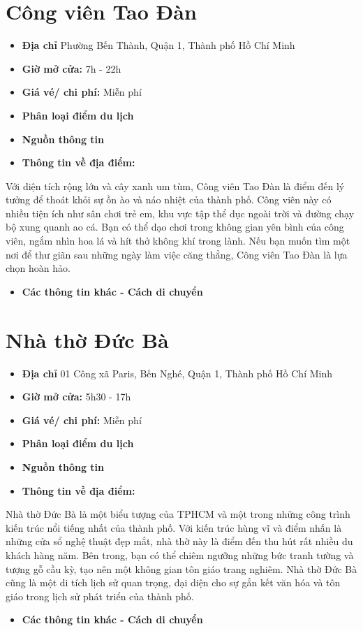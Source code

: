 \documentclass{article}
\begin{document}
\section{Công viên Tao Đàn}
\begin{itemize}
    \item{\textbf{Địa chỉ}} Phường Bến Thành, Quận 1, Thành phố Hồ Chí Minh
    \item{\textbf{Giờ mở cửa:}} 7h - 22h
    \item{\textbf{Giá vé/ chi phí:}} Miễn phí
    \item{\textbf{Phân loại điểm du lịch} }
    \item{\textbf{Nguồn thông tin}}
    \item{\textbf{Thông tin về địa điểm:}}
\end{itemize}
Với diện tích rộng lớn và cây xanh um tùm, Công viên Tao Đàn là điểm đến lý tưởng để thoát khỏi sự ồn ào và náo nhiệt của thành phố. Công viên này có nhiều tiện ích như sân chơi trẻ em, khu vực tập thể dục ngoài trời và đường chạy bộ xung quanh ao cá. Bạn có thể dạo chơi trong không gian yên bình của công viên, ngắm nhìn hoa lá và hít thở không khí trong lành. Nếu bạn muốn tìm một nơi để thư giãn sau những ngày làm việc căng thẳng, Công viên Tao Đàn là lựa chọn hoàn hảo.
\begin{itemize}
    \item{\textbf{Các thông tin khác - Cách di chuyển}}
\end{itemize}

\section{Nhà thờ Đức Bà}
\begin{itemize}
    \item{\textbf{Địa chỉ}} 01 Công xã Paris, Bến Nghé, Quận 1, Thành phố Hồ Chí Minh
    \item{\textbf{Giờ mở cửa:}} 5h30 - 17h
    \item{\textbf{Giá vé/ chi phí:}} Miễn phí
    \item{\textbf{Phân loại điểm du lịch} }
    \item{\textbf{Nguồn thông tin}}
    \item{\textbf{Thông tin về địa điểm:}}
\end{itemize}
Nhà thờ Đức Bà là một biểu tượng của TPHCM và một trong những công trình kiến trúc nổi tiếng nhất của thành phố. Với kiến trúc hùng vĩ và điểm nhấn là những cửa sổ nghệ thuật đẹp mắt, nhà thờ này là điểm đến thu hút rất nhiều du khách hàng năm. Bên trong, bạn có thể chiêm ngưỡng những bức tranh tường và tượng gỗ cầu kỳ, tạo nên một không gian tôn giáo trang nghiêm. Nhà thờ Đức Bà cũng là một di tích lịch sử quan trọng, đại diện cho sự gắn kết văn hóa và tôn giáo trong lịch sử phát triển của thành phố.
\begin{itemize}
    \item{\textbf{Các thông tin khác - Cách di chuyển}}
\end{itemize}
\end{document}
